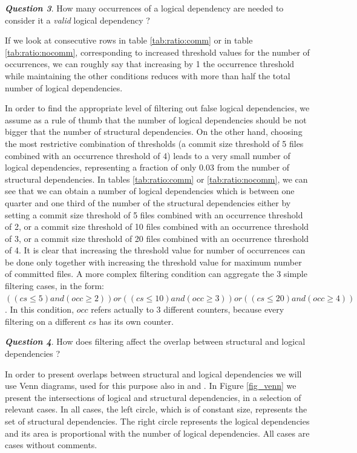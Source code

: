 \documentclass[a4paper,twoside]{article}
\begin{document}
\textit{\textbf{Question 3}}. How many occurrences of a logical dependency are needed to consider it a \textit{valid} logical dependency ? 

If we look at consecutive rows in table \ref{tab:ratio:comm} or in table \ref{tab:ratio:nocomm}, corresponding to increased threshold values for the number of occurrences, we can roughly say that  increasing by 1 the occurrence threshold while maintaining the other conditions reduces with more than half the total number of logical dependencies.  

In order to find the appropriate level of filtering out false logical dependencies, we assume as a rule of thumb that the number of logical dependencies should be not bigger that the number of structural dependencies. On the other hand, choosing the most restrictive combination of thresholds (a commit size threshold of 5 files combined with an occurrence threshold of 4) leads to a very small number of logical dependencies, representing a fraction of only 0.03 from the number of structural dependencies. 
In tables \ref{tab:ratio:comm} or \ref{tab:ratio:nocomm}, we can see that we can obtain a number of logical dependencies which is between one quarter and one third of the number of the structural dependencies either by setting a commit size threshold of 5 files combined with an occurrence threshold of 2, or a commit size threshold of 10 files combined with an occurrence threshold of 3, or a commit size threshold of 20 files combined with an occurrence threshold of 4.  It is clear that increasing the threshold value for number of occurrences can be done only together with increasing the threshold value for maximum number of committed files. A more complex filtering condition can aggregate the 3 simple filtering cases, in the form: $((cs\leq 5) and (occ\geq 2)) or ((cs\leq 10) and (occ\geq 3)) or ((cs\leq 20) and (occ\geq 4))$. In this condition, $occ$ refers actually to 3 different counters, because every filtering on a different $cs$ has its own counter.  


\textit{\textbf{Question 4}}. How does filtering affect the overlap between structural and logical dependencies ? 

In order to present overlaps between structural and logical dependencies we will use Venn diagrams, used for this purpose also in \cite{Oliva:2011:ISL:2067853.2068086} and \cite{DBLP:journals/jss/AjienkaC17}. In Figure \ref{fig_venn} we present the intersections of logical and structural dependencies, in a selection of relevant cases. In all cases, the left circle, which is of constant size, represents the set of structural dependencies. The right circle represents the logical dependencies and its area is proportional with the number of logical dependencies. All cases are cases without comments.
\end{document}
